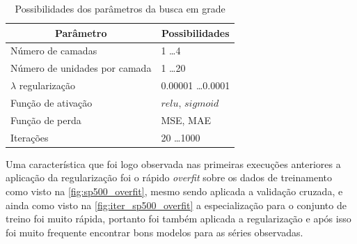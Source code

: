 \documentclass[
    12pt,
    oneside,
    a4paper,
    english,
    brazil
]{abntex2}
\begin{document}
\begin{table}[ht]
\centering
\caption{Possibilidades dos parâmetros da busca em grade}\label{tab:gridsearch}
\begin{tabular}{l l}
\multicolumn{1}{c}{Parâmetro}        & \multicolumn{1}{c}{Possibilidades}  \\
    \toprule
    Número de camadas                & 1 \ldots 4                          \\
    Número de unidades por camada    & 1 \ldots 20                         \\
    $\lambda$ regularização          & 0.00001 \ldots 0.0001               \\
    Função de ativação               & $relu$, $sigmoid$                   \\
    Função de perda                  & MSE, MAE                            \\
    Iterações                        & 20 \ldots 1000
\end{tabular}
\end{table}

Uma característica que foi logo  observada nas primeiras execuções anteriores a
aplicação  da regularização  foi o  rápido \textit{overfit}  sobre os  dados de
treinamento como  visto na \autoref{fig:sp500_overfit}, mesmo  sendo aplicada a
validação  cruzada, e  ainda como  visto na  \autoref{fig:iter_sp500_overfit} a
especialização para o conjunto de treino  foi muito rápida, portanto foi também
aplicada a regularização e após isso foi muito frequente encontrar bons modelos
para as séries observadas.
\end{document}
